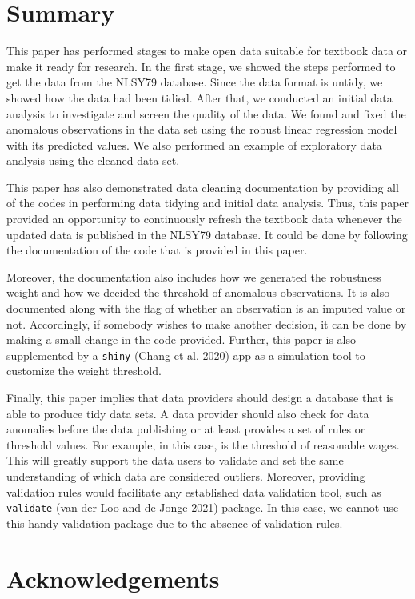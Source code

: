 \documentclass{article}
\begin{document}
\hypertarget{summary}{%
\section{Summary}\label{summary}}

This paper has performed stages to make open data suitable for textbook data or make it ready for research. In the first stage, we showed the steps performed to get the data from the NLSY79 database. Since the data format is untidy, we showed how the data had been tidied. After that, we conducted an initial data analysis to investigate and screen the quality of the data. We found and fixed the anomalous observations in the data set using the robust linear regression model with its predicted values. We also performed an example of exploratory data analysis using the cleaned data set.

This paper has also demonstrated data cleaning documentation by providing all of the codes in performing data tidying and initial data analysis. Thus, this paper provided an opportunity to continuously refresh the textbook data whenever the updated data is published in the NLSY79 database. It could be done by following the documentation of the code that is provided in this paper.

Moreover, the documentation also includes how we generated the robustness weight and how we decided the threshold of anomalous observations. It is also documented along with the flag of whether an observation is an imputed value or not. Accordingly, if somebody wishes to make another decision, it can be done by making a small change in the code provided. Further, this paper is also supplemented by a \texttt{shiny} (Chang et al. 2020) app as a simulation tool to customize the weight threshold.

Finally, this paper implies that data providers should design a database that is able to produce tidy data sets. A data provider should also check for data anomalies before the data publishing or at least provides a set of rules or threshold values. For example, in this case, is the threshold of reasonable wages. This will greatly support the data users to validate and set the same understanding of which data are considered outliers. Moreover, providing validation rules would facilitate any established data validation tool, such as \texttt{validate} (van der Loo and de Jonge 2021) package. In this case, we cannot use this handy validation package due to the absence of validation rules.

\hypertarget{acknowledgements}{%
\section{Acknowledgements}\label{acknowledgements}}
\end{document}
